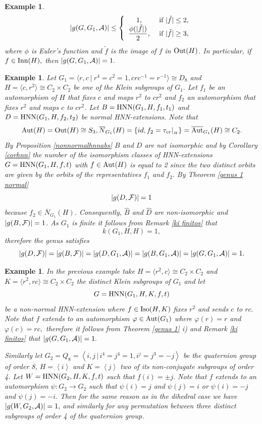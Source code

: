 \documentclass[a4paper,12pt]{article}
\newcommand{\A}{{\cal A}}
\newcommand{\F}{{\cal F}}
\def\aut {{\rm Aut}}
\def\out {{\rm Out}}
\def\inn {{\rm Inn}}
\def\hnn {{\rm HNN}}
\def\Iso {{\rm Iso}}
\newtheorem{exa}[thm]{Example}
\begin{document}
{\begin{exa}
$$|g(G,G_1,\A)| \leq \left\{\begin{array}{cc}
  1,&\mbox{ if } |\tilde f| \leq 2,\\
\displaystyle\frac{\phi(|\tilde f|)}{2}, &\mbox{ if } |\tilde f| \geq 3,
\end{array}\right.$$
where $\phi$ is Euler's function and $\tilde f$ is the image of $f$ in $\out(H)$.
In particular, if $f \in \inn(H),$  then $|g(G,G_1,\A)|=1.$    
\end{exa}

\begin{exa}\label{dieadra ove klein} Let $G_1= \langle r, c \ | \ r^4=c^2=1, crc^{-1}=r^{-1}\rangle \cong D_8$  and $H=\langle c, r^2\rangle \cong C_2 \times C_2$ be one of the Klein subgroups of $G_1.$ Let $f_1$ be an automorphism of $H$ that fixes $c$ and maps $r^2$ to $cr^2$ and $f_2$ an automorphism that fixes $r^2$ and maps $c$ to $cr^2$. Let $B=\hnn(G_1, H,  f_1,t_1)$ and $D=\hnn(G_1, H, f_2,t_2)$  be normal HNN-extensions. Note that $$\aut(H)=\out(H)\cong S_3, \overline{N}_{G_1}(H)=\{id, f_2=\tau_{cr}|_{_{H}}\} = \overline{\aut}_{G_1}(H) \cong C_2.$$ By Proposition \ref{nonnormalhnnabs}  $B$ and $D$ are not isomorphic 
and by Corollary \ref{corhnn}  the number of the isomorphism classes of HNN-extensions $G=\hnn(G_1, H, f,t)$ with $f\in \aut(H)$ is equal to 2 since the two distinct orbits are given by the orbits of the representatives $f_1$ and $f_2.$ By Theorem \ref{genus 1 normal}  $$|g(D, \F)|=1$$ because $f_2 \in \overline{N}_{G_1}(H)$. Consequently, $\widehat B$ and $\widehat D$
are non-isomorphic and $|g(B,\F)|=1$.
As $G_1$ is finite it follows from Remark \ref{ki finitos} that $$k(G_1, H, H)=1,$$ therefore the genus satisfies $$|g(D, \F)|=|g(B,\F)|=|g(D,G_1,\A)|=|g(B,G_1,\A)|=|g(G,G_1,\A)|=1.$$
\end{exa}


\begin{exa} In the previous example take $H=\langle r^2,  c \rangle \cong C_2 \times C_2$ and $K=\langle r^2, r c \rangle \cong C_2 \times C_2$ the distinct Klein subgroups of $G_1$ and let $$G=\hnn(G_1, H, K, f, t)$$ be a non-normal HNN-extension where $f \in \Iso(H, K)$ fixes $r^2$ and sends $c$ to $rc.$ Note that $f$ extends to an automorphism $\varphi \in \aut(G_1)$ where $\varphi(r)=r$ and $\varphi(c) = rc,$ therefore it follows from  Theorem \ref{genus 1} i) and Remark \ref{ki finitos} that $|g(G, G_1,\A)|=1.$ 

Similarly let $G_2=Q_8=\left \langle i, j\,|\, i^4=j^4=1, i^j=j^{3}=-j \right \rangle$ be the quaternion group of order 8, $H=\left \langle i \right \rangle$ and $K=\left \langle j \right \rangle $ two of its non-conjugate subgroups of order 4. Let $W=\hnn(G_2, H, K, f, t)$ such that $f(i)=\pm j.$ Note that $f$ extends to an automorphism $\psi: G_2 \longrightarrow G_2$ such that $\psi(i)=j$ and $\psi(j)=i$ or $\psi(i)=-j$ and $\psi(j)=-i.$ Then for the same reason as in the dihedral case we have  $|g(W, G_2,\A)|=1,$ and similarly for any permutation between three distinct subgroups of order 4 of the quaternion group.
\end{exa} 

}
\end{document}
